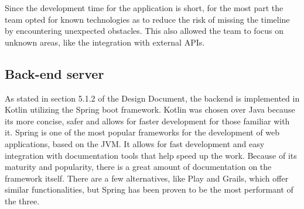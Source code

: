Since the development time for the application is short, for the most part the team opted for known technologies as to reduce the risk of missing the timeline by encountering unexpected obstacles. This also allowed the team to focus on unknown areas, like the integration with external APIs.\\

\subsection{Back-end server}

As stated in section 5.1.2 of the Design Document, the backend is implemented in Kotlin utilizing the Spring boot framework.
Kotlin was chosen over Java because its more concise, safer and allows for faster development for those familiar with it.
Spring is one of the most popular frameworks for the development of web applications, based on the JVM. It allows for fast development and easy integration with documentation tools that help speed up the work. Because of its maturity and popularity, there is a great amount of documentation on the framework itself. There are a few alternatives, like Play and Grails, which offer similar functionalities, but Spring has been proven to be the most performant of the three.
